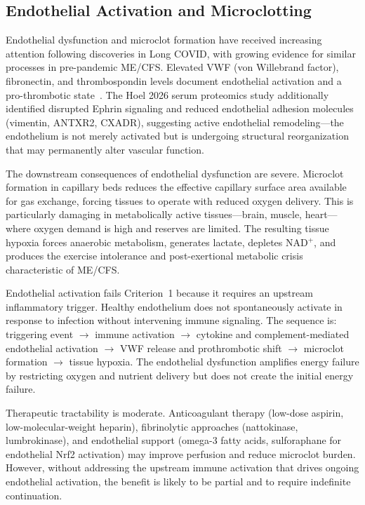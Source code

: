 \subsection{Endothelial Activation and Microclotting}
\label{sec:amp-endothelial}

Endothelial dysfunction and microclot formation have received increasing attention following discoveries in Long COVID, with growing evidence for similar processes in pre-pandemic ME/CFS. Elevated VWF (von Willebrand factor), fibronectin, and thrombospondin levels document endothelial activation and a pro-thrombotic state~\cite{Hoel2026proteome}. The Hoel 2026 serum proteomics study additionally identified disrupted Ephrin signaling and reduced endothelial adhesion molecules (vimentin, ANTXR2, CXADR), suggesting active endothelial remodeling---the endothelium is not merely activated but is undergoing structural reorganization that may permanently alter vascular function.

The downstream consequences of endothelial dysfunction are severe. Microclot formation in capillary beds reduces the effective capillary surface area available for gas exchange, forcing tissues to operate with reduced oxygen delivery. This is particularly damaging in metabolically active tissues---brain, muscle, heart---where oxygen demand is high and reserves are limited. The resulting tissue hypoxia forces anaerobic metabolism, generates lactate, depletes NAD$^+$, and produces the exercise intolerance and post-exertional metabolic crisis characteristic of ME/CFS.

Endothelial activation fails Criterion~1 because it requires an upstream inflammatory trigger. Healthy endothelium does not spontaneously activate in response to infection without intervening immune signaling. The sequence is: triggering event $\rightarrow$ immune activation $\rightarrow$ cytokine and complement-mediated endothelial activation $\rightarrow$ VWF release and prothrombotic shift $\rightarrow$ microclot formation $\rightarrow$ tissue hypoxia. The endothelial dysfunction amplifies energy failure by restricting oxygen and nutrient delivery but does not create the initial energy failure.

Therapeutic tractability is moderate. Anticoagulant therapy (low-dose aspirin, low-molecular-weight heparin), fibrinolytic approaches (nattokinase, lumbrokinase), and endothelial support (omega-3 fatty acids, sulforaphane for endothelial Nrf2 activation) may improve perfusion and reduce microclot burden. However, without addressing the upstream immune activation that drives ongoing endothelial activation, the benefit is likely to be partial and to require indefinite continuation.


